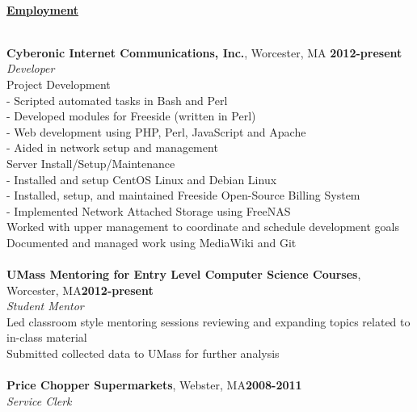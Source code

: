 \documentclass[10pt,notitlepage]{article}
\newenvironment{area}
	{
		\vspace{1em}
		\fontfamily{\sfdefault}\selectfont\begin{singlespace}
	}
	{\\\hrulefill\end{singlespace}\par}
\newcommand{\areaName}[1]{
	\noindent \uline{\hfill\phantom{.}}\\
	\uline{\phantom{.}\hfill{\Large\textbf{#1}}\hfill\phantom{.}}\\
}
\newcommand{\B}[1]{\textbf{#1}}
\newcommand{\I}[1]{\textit{#1}}
\begin{document}
\newpage
\begin{area}
	\areaName{Employment}
\end{area}
\noindent \B{Cyberonic Internet Communications, Inc.}, Worcester, MA
\hfill\B{2012-present}\\
\I{Developer}\\
\indent Project Development\\
	\indent \indent - Scripted automated tasks in Bash and Perl\\
	\indent \indent - Developed modules for Freeside (written in Perl)\\
	\indent \indent - Web development using PHP, Perl, JavaScript and Apache\\
	\indent \indent - Aided in network setup and management\\
\indent Server Install/Setup/Maintenance\\
	\indent \indent - Installed and setup CentOS Linux and Debian Linux\\
	\indent \indent - Installed, setup, and maintained Freeside Open-Source
	Billing System\\
	\indent \indent - Implemented Network Attached Storage using FreeNAS\\
\indent Worked with upper management to coordinate and schedule development
goals\\
\indent Documented and managed work using MediaWiki and Git\\\\
\noindent \B{UMass Mentoring for Entry Level Computer Science Courses}, Worcester,
MA\hfill\B{2012-present}\\
\I{Student Mentor}\\
\indent Led classroom style mentoring sessions reviewing and expanding topics related
to in-class material\\
\indent Submitted collected data to UMass for further analysis\\\\
\noindent \B{Price Chopper Supermarkets}, Webster, MA\hfill\B{2008-2011}\\
\I{Service Clerk}
\end{document}

